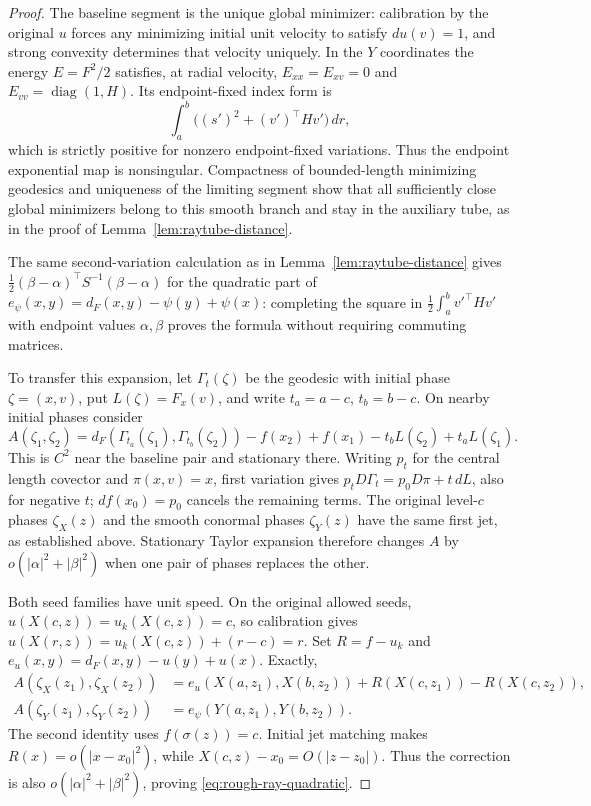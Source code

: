 \documentclass[11pt,reqno]{amsart}
\theoremstyle{definition}
\theoremstyle{remark}
\numberwithin{equation}{section}
\begin{document}
\begin{proof}
The baseline segment is the unique global minimizer: calibration by
the original \(u\) forces any minimizing initial unit velocity to
satisfy \(du(v)=1\), and strong convexity determines that velocity
uniquely. In the \(Y\) coordinates the energy \(E=F^2/2\) satisfies,
at radial velocity, \(E_{xx}=E_{xv}=0\) and
\(E_{vv}=\operatorname{diag}(1,H)\). Its endpoint-fixed index form is
\[
\int_a^b\bigl((s')^2+(v')^\top Hv'\bigr)\,dr,
\]
which is strictly positive for nonzero endpoint-fixed variations.
Thus the endpoint exponential map is nonsingular. Compactness of
bounded-length minimizing geodesics and uniqueness of the limiting
segment show that all sufficiently close global minimizers belong
to this smooth branch and stay in the auxiliary tube, as in the
proof of Lemma~\ref{lem:raytube-distance}.

The same second-variation calculation as in
Lemma~\ref{lem:raytube-distance} gives
\(\tfrac12(\beta-\alpha)^\top S^{-1}(\beta-\alpha)\) for the
quadratic part of
\(e_\psi(x,y)=d_F(x,y)-\psi(y)+\psi(x)\): completing the square
in \(\tfrac12\int_a^b v'^\top Hv'\) with endpoint values
\(\alpha,\beta\) proves the formula without requiring commuting
matrices.

To transfer this expansion, let \(\Gamma_t(\zeta)\) be the geodesic
with initial phase \(\zeta=(x,v)\), put \(L(\zeta)=F_x(v)\), and
write \(t_a=a-c\), \(t_b=b-c\). On nearby initial phases consider
\[
 A(\zeta_1,\zeta_2)
 =d_F(\Gamma_{t_a}(\zeta_1),\Gamma_{t_b}(\zeta_2))
  -f(x_2)+f(x_1)-t_bL(\zeta_2)+t_aL(\zeta_1).
\]
This is \(C^2\) near the baseline pair and stationary there. Writing
\(p_t\) for the central length covector and \(\pi(x,v)=x\),
first variation gives \(p_tD\Gamma_t=p_0D\pi+t\,dL\), also for
negative \(t\); \(df(x_0)=p_0\) cancels the remaining terms.
The original level-\(c\) phases \(\zeta_X(z)\) and the smooth
conormal phases \(\zeta_Y(z)\) have the same first jet, as established
above. Stationary Taylor expansion therefore changes \(A\) by
\(o(|\alpha|^2+|\beta|^2)\) when one pair of phases replaces the other.

Both seed families have unit speed. On the original allowed seeds,
\(u(X(c,z))=u_k(X(c,z))=c\), so calibration gives
\(u(X(r,z))=u_k(X(c,z))+(r-c)=r\). Set \(R=f-u_k\) and
\(e_u(x,y)=d_F(x,y)-u(y)+u(x)\). Exactly,
\[
\begin{split}
 A(\zeta_X(z_1),\zeta_X(z_2))
 &=e_u(X(a,z_1),X(b,z_2))
   +R(X(c,z_1))-R(X(c,z_2)),\\
 A(\zeta_Y(z_1),\zeta_Y(z_2))
 &=e_\psi(Y(a,z_1),Y(b,z_2)).
\end{split}
\]
The second identity uses \(f(\sigma(z))=c\). Initial jet matching
makes \(R(x)=o(|x-x_0|^2)\), while
\(X(c,z)-x_0=O(|z-z_0|)\). Thus the correction is also
\(o(|\alpha|^2+|\beta|^2)\), proving
\eqref{eq:rough-ray-quadratic}.
\end{proof}
\end{document}
